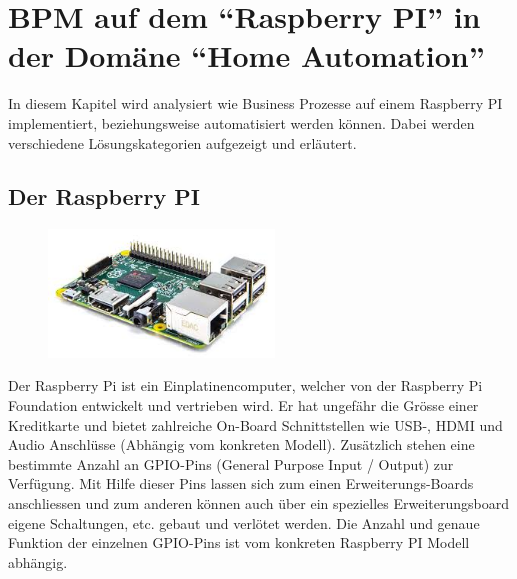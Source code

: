 
\chapter{BPM auf dem "`Raspberry PI"' in der Domäne "`Home Automation"'}
In diesem Kapitel wird analysiert wie Business Prozesse auf einem Raspberry PI implementiert, beziehungsweise automatisiert werden können. Dabei werden verschiedene Lösungskategorien aufgezeigt und erläutert.


\section{Der Raspberry PI}
\begin{figure}
  \centering
  \includegraphics[width=6cm]{./images/RaspberryPi2ModelB}
\end{figure}
  
Der Raspberry Pi ist ein Einplatinencomputer, welcher von der Raspberry Pi Foundation entwickelt und vertrieben wird. Er hat ungefähr die Grösse einer Kreditkarte und bietet zahlreiche On-Board Schnittstellen wie USB-, HDMI und Audio Anschlüsse (Abhängig vom konkreten Modell). Zusätzlich stehen eine bestimmte Anzahl an GPIO-Pins (General Purpose Input / Output) zur Verfügung. Mit Hilfe dieser Pins lassen sich zum einen Erweiterungs-Boards anschliessen und zum anderen können auch über ein spezielles Erweiterungsboard eigene Schaltungen, etc. gebaut und verlötet werden. Die Anzahl und genaue Funktion der einzelnen GPIO-Pins ist vom konkreten Raspberry PI Modell abhängig.

